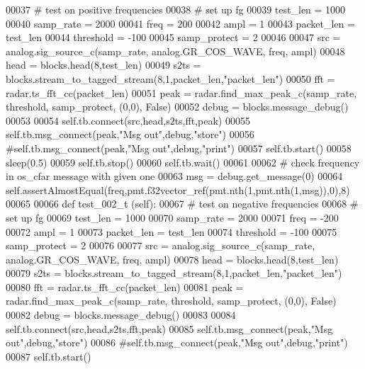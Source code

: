 \begin{DoxyCode}
00037         \textcolor{comment}{# test on positive frequencies}
00038         \textcolor{comment}{# set up fg}
00039         test\_len = 1000
00040         samp\_rate = 2000
00041         freq = 200
00042         ampl = 1
00043         packet\_len = test\_len
00044         threshold = -100
00045         samp\_protect = 2
00046         
00047         src = analog.sig\_source\_c(samp\_rate, analog.GR\_COS\_WAVE, freq, ampl)
00048         head = blocks.head(8,test\_len)
00049         s2ts = blocks.stream\_to\_tagged\_stream(8,1,packet\_len,\textcolor{stringliteral}{"packet\_len"})
00050         fft = radar.ts\_fft\_cc(packet\_len)
00051         peak = radar.find\_max\_peak\_c(samp\_rate, threshold, samp\_protect, (0,0), \textcolor{keyword}{False})
00052         debug = blocks.message\_debug()
00053         
00054         self.tb.connect(src,head,s2ts,fft,peak)
00055         self.tb.msg\_connect(peak,\textcolor{stringliteral}{"Msg out"},debug,\textcolor{stringliteral}{"store"})
00056         \textcolor{comment}{#self.tb.msg\_connect(peak,"Msg out",debug,"print")}
00057         self.tb.start()
00058         sleep(0.5)
00059         self.tb.stop()
00060         self.tb.wait()
00061         
00062         \textcolor{comment}{# check frequency in os\_cfar message with given one}
00063         msg = debug.get\_message(0)
00064         self.assertAlmostEqual(freq,pmt.f32vector\_ref(pmt.nth(1,pmt.nth(1,msg)),0),8)
00065         
00066     \textcolor{keyword}{def }test_002_t (self):
00067         \textcolor{comment}{# test on negative frequencies}
00068         \textcolor{comment}{# set up fg}
00069         test\_len = 1000
00070         samp\_rate = 2000
00071         freq = -200
00072         ampl = 1
00073         packet\_len = test\_len
00074         threshold = -100
00075         samp\_protect = 2
00076         
00077         src = analog.sig\_source\_c(samp\_rate, analog.GR\_COS\_WAVE, freq, ampl)
00078         head = blocks.head(8,test\_len)
00079         s2ts = blocks.stream\_to\_tagged\_stream(8,1,packet\_len,\textcolor{stringliteral}{"packet\_len"})
00080         fft = radar.ts\_fft\_cc(packet\_len)
00081         peak = radar.find\_max\_peak\_c(samp\_rate, threshold, samp\_protect, (0,0), \textcolor{keyword}{False})
00082         debug = blocks.message\_debug()
00083         
00084         self.tb.connect(src,head,s2ts,fft,peak)
00085         self.tb.msg\_connect(peak,\textcolor{stringliteral}{"Msg out"},debug,\textcolor{stringliteral}{"store"})
00086         \textcolor{comment}{#self.tb.msg\_connect(peak,"Msg out",debug,"print")}
00087         self.tb.start()

\end{DoxyCode}

